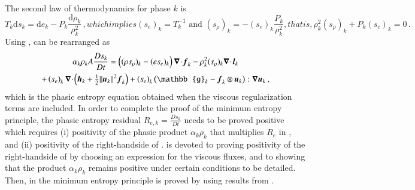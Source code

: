 %
The second law of thermodynamics for phase $k$ is 
%
\begin{subequations}
\begin{equation}\label{eq:2nd-therm-laws-sect4}
T_k \text{d} s_k = \text{d}e_k - P_k\frac{\text{d}\rho_k}{\rho_k^2} \,,
\end{equation}
which implies 
\begin{equation}
(s_e)_k = T_k^{-1} \text{ and } (s_\rho)_k = - (s_e)_k \frac{P_k }{\rho_k^2} ,
\end{equation}
that is, 
\begin{equation} \label{eq:expr-zero}
\rho_k^2 (s_\rho)_k + P_k (s_e)_k  = 0 \,.
\end{equation}
\end{subequations}
% 
Using ,  can be rearranged as 
\begin{multline}\label{eq:ent-res-7-eqn-diss-terms_rearranged}
\alpha_k \rho_k A \frac{Ds_k}{Dt} 
=  \left( (\rho s_\rho)_k - (e s_e)_k \right) \div \mbold f_k 
- \rho^2_k (s_\rho)_k \div \mbold l_k  \\
+ \left(s_e\right)_k \div \left( \mbold h_k + \tfrac{1}{2} \| \mbold u_k \|^2  \mbold f_k \right)
+ \left(s_e\right)_k \left( \mathbb{g}_k - \mbold f_k \otimes \mbold u_k \right) : \grad \mbold u_k 
\,,
\end{multline}
which is the phasic entropy equation obtained when the viscous regularization terms are included. In order to complete the proof of the minimum entropy
principle, the phasic entropy residual $R_{e,k} = \frac{Ds_k}{Dt}$ needs to be proved positive which requires (i) positivity of the phasic product $\alpha_k \rho_k$
that multiplies $R_e$ in , and (ii) positivity of the right-handside of .
 is devoted to proving positivity of the right-handside of  by choosing an expression for the viscous
fluxes, and to showing that the product $\alpha_k \rho_k$ remains positive under certain conditions to be detailed. Then, in  the minimum entropy principle is
proved by using results from .
%
